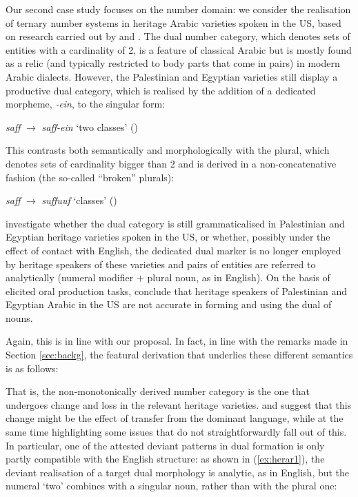 \documentclass[output=paper]{langscibook}
\begin{document}
Our second case study focuses on the number domain: we consider the realisation of ternary number systems in heritage Arabic varieties spoken in the US, based on research carried out by \citet{AlbiriniBenmamoun2014} and \citet{Albirini2014}. The dual number category, which denotes sets of entities with a cardinality of 2, is a feature of classical Arabic but is mostly found as a relic (and typically restricted to body parts that come in pairs) in modern Arabic dialects. However, the Palestinian and Egyptian varieties still display a productive dual category, which is realised by the addition of a dedicated morpheme, \textit{-ein}, to the singular form:
\begin{exe}
\ex \textit{saff} $\rightarrow$ \textit{saff-ein} `two classes' (\citealt[247]{AlbiriniBenmamoun2014})
\end{exe}
This contrasts both semantically and morphologically with the plural, which denotes sets of cardinality bigger than 2 and is derived in a non-concatenative fashion (the so-called ``broken'' plurals):
\begin{exe}
\ex \textit{saff} $\rightarrow$ \textit{suffuuf} `classes' (\citealt[255]{AlbiriniBenmamoun2014})
\end{exe}
\citet{AlbiriniBenmamoun2014} investigate whether the dual category is still grammaticalised in Palestinian and Egyptian heritage varieties spoken in the US, or whether, possibly under the effect of contact with English, the dedicated dual marker is no longer employed by heritage speakers of these varieties and pairs of entities are referred to analytically (numeral modifier $+$ plural noun, as in English). On the basis of elicited oral production tasks, \citet{AlbiriniBenmamoun2014} conclude that heritage speakers of Palestinian and Egyptian Arabic in the US are not accurate in forming and using the dual of nouns.

Again, this is in line with our proposal. In fact, in line with the remarks made in Section \ref{sec:backg}, the featural derivation that underlies these different semantics is as follows:
\begin{exe}
\ex {}
\end{exe}
That is, the non-monotonically derived number category is the one that undergoes change and loss in the relevant heritage varieties. \citet{AlbiriniBenmamoun2014} and \citet{Albirini2014} suggest that this change might be the effect of transfer from the dominant language, while at the same time highlighting some issues that do not straightforwardly fall out of this. In particular, one of the attested deviant patterns in dual formation is only partly compatible with the English structure: as shown in (\ref{ex:herar1}), the deviant realisation of a target dual morphology is analytic, as in English, but the numeral `two' combines with a singular noun, rather than with the plural one:
\end{document}
